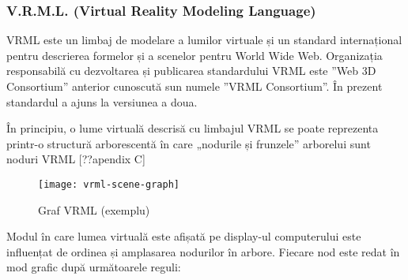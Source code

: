 \subsubsection{V.R.M.L. (Virtual Reality Modeling Language)}
\par VRML este un limbaj de modelare a lumilor virtuale și un standard internațional pentru descrierea formelor și a scenelor pentru World Wide Web. Organizația responsabilă cu dezvoltarea și publicarea standardului VRML este ”Web 3D Consortium” anterior cunoscută sun numele ”VRML Consortium”. În prezent standardul a ajuns la versiunea a doua.
\par În principiu, o lume virtuală descrisă cu limbajul VRML se poate reprezenta printr-o structură arborescentă în care „nodurile și frunzele” arborelui sunt noduri VRML [??apendix C]

\begin{figure}[h]
    \centering
    \texttt{[image: vrml-scene-graph]}
    \caption{Graf VRML (exemplu)}
    \label{fig:graphvrml}
\end{figure}

\par Modul în care lumea virtuală este afișată pe display-ul computerului  este influențat de ordinea și amplasarea nodurilor în arbore. Fiecare nod este redat în mod grafic după următoarele reguli:

